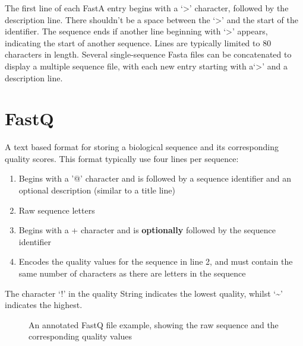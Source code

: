 \documentclass[12pt]{report}
\begin{document}
The first line of each FastA entry begins with a `\textgreater' character, followed by the description line. There shouldn't be a space between the `\textgreater' and the start of the identifier. The sequence ends if another line beginning with `\textgreater' appears, indicating the start of another sequence. Lines are typically limited to 80 characters in length. Several single-sequence Fasta files can be concatenated to display a multiple sequence file, with each new entry starting with a`\textgreater' and a description line.

\section*{FastQ}
A text based format for storing a biological sequence and its corresponding quality scores. This format typically use four lines per sequence:
\begin{enumerate}
	\item Begins with a '@' character and is followed by a sequence identifier and an optional description (similar to a title line)
	\item Raw sequence letters
	\item Begins with a + character and is \textbf{optionally} followed by the sequence identifier
	\item Encodes the quality values for the sequence in line 2, and must contain the same number of characters as there are letters in the sequence
\end{enumerate}
The character `!' in the quality String indicates the lowest quality, whilst `\textasciitilde' indicates the highest. 
\begin{figure}[!ht]
	\centering
	\caption{An annotated FastQ file example, showing the raw sequence and the corresponding quality values}\label{FastQ}
\end{figure}
\end{document}
